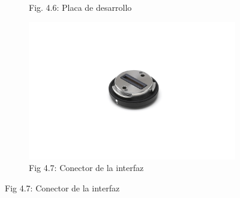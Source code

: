 \documentclass[12pt]{article}
\begin{document}
\begin{figure}[ht]
\begin{subfigure}[b]{0.45\linewidth}
    \caption{Fig. 4.6: Placa de desarrollo}
  \end{subfigure}
  \begin{subfigure}[b]{0.45\linewidth}
    \includegraphics[width=\linewidth]{images/Payload-DBK-3.jpg}
    \caption{Fig 4.7: Conector de la interfaz}
  \end{subfigure}
\end{figure}
\end{document}
